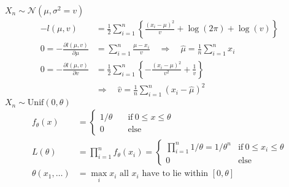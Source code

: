 \begin{examplesection}[Examples]
    $X_n\sim\mathcal{N}(\mu,\sigma^2=v)$
    \noindent\begin{align*}
        -l(\mu,v)                                & =\frac12\sum_{i=1}^n\left\{\frac{{(x_i-\mu)}^2}v+\log(2\pi)+\log(v)\right\}         \\
        0=-\frac{\partial l(\mu,v)}{\partial\mu} & =\sum_{i=1}^n\frac{\mu-x_i}v\quad\Rightarrow\quad \hat{\mu}=\frac1n\sum_{i=1}^n x_i \\
        0=-\frac{\partial l(\mu,v)}{\partial v}  & =\frac12\sum_{i=1}^n\left\{-\frac{{(x_i-\mu)}^2}{v^2}+\frac1v\right\}               \\
                                                 & \Rightarrow\quad\hat{v}=\frac1n\sum_{i=1}^n{(x_i-\hat{\mu})}^2
    \end{align*}
    $X_n\sim \mathrm{Unif}(0,\theta)$
    \noindent\begin{align*}
        f_\theta(x)        & =\begin{cases}
                                  1/\theta & \quad\mathrm{if~}0\leq x\leq\theta \\
                                  0        & \quad\mathrm{else}
                              \end{cases}                                                  \\
        L(\theta)          & =\prod_{i=1}^n f_\theta(x_i)=\begin{cases}
                                                              \prod_{i=1}^n1/\theta=1/\theta^n & \mathrm{if~}0\leq x_i\leq\theta \\
                                                              0                                & \mathrm{else}
                                                          \end{cases} \\
        \theta(x_1,\ldots) & =\max_i x_i \text{ all } x_i \text{ have to lie within } [0,\theta]
    \end{align*}
\end{examplesection}

